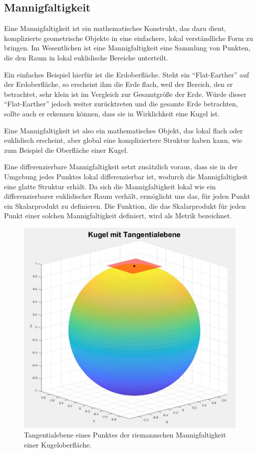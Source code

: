 \subsection{Mannigfaltigkeit}
Eine Mannigfaltigkeit ist ein mathematisches Konstrukt, das dazu dient, komplizierte geometrische Objekte in eine einfachere, lokal verständliche Form zu bringen.
Im Wesentlichen ist eine Mannigfaltigkeit eine Sammlung von Punkten, die den Raum in lokal euklidische Bereiche unterteilt. 

Ein einfaches Beispiel hierfür ist die Erdoberfläche.
Steht ein ``Flat-Earther'' auf der Erdoberfläche, so erscheint ihm die Erde flach, weil der Bereich, den er betrachtet, sehr klein ist im Vergleich zur Gesamtgröße der Erde.
Würde dieser ``Flat-Earther'' jedoch weiter zurücktreten und die gesamte Erde betrachten, sollte auch er erkennen können, dass sie in Wirklichkeit eine Kugel ist.

Eine Mannigfaltigkeit ist also ein mathematisches Objekt, das lokal flach oder euklidisch erscheint, aber global eine kompliziertere Struktur haben kann, wie zum Beispiel die Oberfläche einer Kugel.

Eine differenzierbare Mannigfaltigkeit setzt zusätzlich voraus, dass sie in der Umgebung jedes Punktes lokal differenzierbar ist, wodurch die Mannigfaltigkeit eine glatte Struktur erhält.
%
Da sich die Mannigfaltigkeit lokal wie ein differenzierbarer euklidischer Raum verhält, ermöglicht uns das, für jeden Punkt ein Skalarprodukt zu definieren.
Die Funktion, die das Skalarprodukt für jeden Punkt einer solchen Mannigfaltigkeit definiert, wird als Metrik bezeichnet.
%

\begin{figure}
	\centering
	\includegraphics[width=1\linewidth]{papers/geodaeten/Abbildungen/MetrischerTensor/Tangentialebene}
	\caption{Tangentialebene eines Punktes der riemannschen Mannigfaltigkeit einer Kugeloberfläche.}
	\label{geodaeten:figure:MetrischerTensor:Tangentialebene}
\end{figure}

